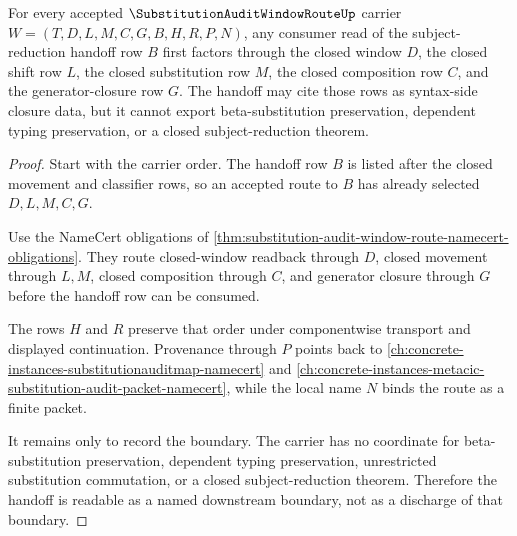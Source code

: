 \begin{theorem}
\label{thm:substitution-audit-window-route-closed-composition-handoff}
For every accepted $\SubstitutionAuditWindowRouteUp$ carrier $W=(T,D,L,M,C,G,B,H,R,P,N)$, any consumer read of the subject-reduction handoff row $B$ first factors through the closed window $D$, the closed shift row $L$, the closed substitution row $M$, the closed composition row $C$, and the generator-closure row $G$. The handoff may cite those rows as syntax-side closure data, but it cannot export beta-substitution preservation, dependent typing preservation, or a closed subject-reduction theorem.
\end{theorem}
\begin{proof}
Start with the carrier order. The handoff row $B$ is listed after the closed movement and classifier rows, so an accepted route to $B$ has already selected $D,L,M,C,G$.

Use the NameCert obligations of \autoref{thm:substitution-audit-window-route-namecert-obligations}. They route closed-window readback through $D$, closed movement through $L,M$, closed composition through $C$, and generator closure through $G$ before the handoff row can be consumed.

The rows $H$ and $R$ preserve that order under componentwise transport and displayed continuation. Provenance through $P$ points back to \autoref{ch:concrete-instances-substitutionauditmap-namecert} and \autoref{ch:concrete-instances-metacic-substitution-audit-packet-namecert}, while the local name $N$ binds the route as a finite packet.

It remains only to record the boundary. The carrier has no coordinate for beta-substitution preservation, dependent typing preservation, unrestricted substitution commutation, or a closed subject-reduction theorem. Therefore the handoff is readable as a named downstream boundary, not as a discharge of that boundary.
\end{proof}


